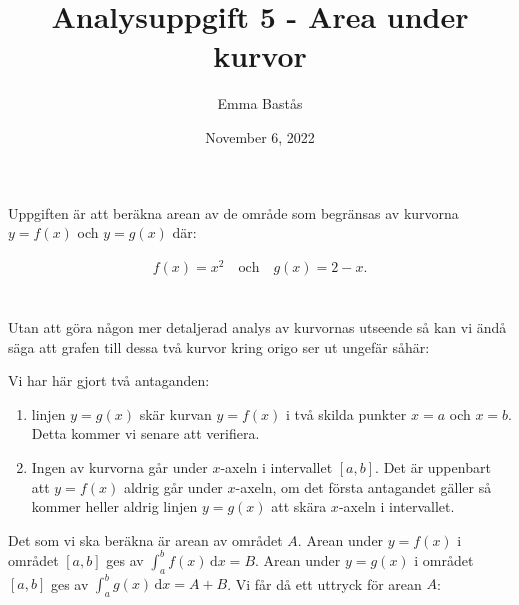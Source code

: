 \documentclass{article}
\title{Analysuppgift 5 - Area under kurvor}
\author{Emma Bastås}
\date{November 6, 2022}
\begin{document}
\maketitle

\noindent Uppgiften är att beräkna arean av de område som begränsas av kurvorna $y = f(x)$ och $y = g(x)$ där:

\begin{gather*}
  f(x) = x^{2} \quad\text{och}\quad g(x) = 2 - x\text{.}
\end{gather*}
\\
\\
Utan att göra någon mer detaljerad analys av kurvornas utseende så kan vi ändå säga att grafen till dessa två kurvor kring origo ser ut ungefär såhär:

\begin{center}
\end{center}

\noindent Vi har här gjort två antaganden:

\begin{enumerate}
        \item linjen $y = g(x)$ skär kurvan $y = f(x)$ i två skilda punkter $x = a$ och $x = b$. Detta kommer vi senare att verifiera.
        \item Ingen av kurvorna går under $x$-axeln i intervallet $[a,b]$. Det är uppenbart att $y = f(x)$ aldrig går under $x$-axeln, om det första antagandet gäller så kommer heller aldrig linjen $y = g(x)$ att skära $x$-axeln i intervallet.
\end{enumerate}

\noindent Det som vi ska beräkna är arean av området $A$. Arean under $y = f(x)$ i området $[a, b]$ ges av $\int_{a}^{b} f(x) \,\mathrm{d}x = B$. Arean under $y = g(x)$ i området $[a, b]$ ges av $\int_{a}^{b} g(x) \,\mathrm{d}x = A + B$. Vi får då ett uttryck för arean $A$:
\end{document}
